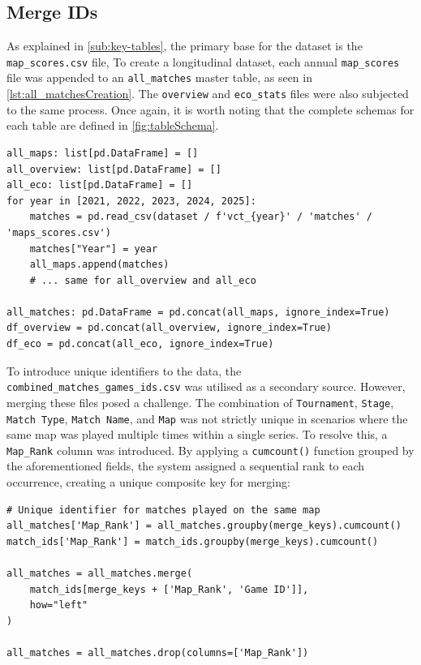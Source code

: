 \subsection{Merge IDs}
As explained in \autoref{sub:key-tables}, the primary base for the dataset is the \texttt{map\_scores.csv} file, To create a longitudinal dataset, each annual \texttt{map\_scores} file was appended to an \texttt{all\_matches} master table, as seen in \autoref{lst:all_matchesCreation}. The \texttt{overview} and \texttt{eco_stats} files were also subjected to the same process. Once again, it is worth noting that the complete schemas for each table are defined in \autoref{fig:tableSchema}.

\begin{lstlisting}[style=code, caption={Consolidating all five years worth of statistics for maps_scores, overview, and eco_stats}, label={lst:all_matchesCreation}]
all_maps: list[pd.DataFrame] = []
all_overview: list[pd.DataFrame] = []
all_eco: list[pd.DataFrame] = []
for year in [2021, 2022, 2023, 2024, 2025]:
    matches = pd.read_csv(dataset / f'vct_{year}' / 'matches' / 'maps_scores.csv')
    matches["Year"] = year
    all_maps.append(matches)
    # ... same for all_overview and all_eco

all_matches: pd.DataFrame = pd.concat(all_maps, ignore_index=True)
df_overview = pd.concat(all_overview, ignore_index=True)
df_eco = pd.concat(all_eco, ignore_index=True)
\end{lstlisting}

To introduce unique identifiers to the data, the \texttt{combined\_matches\_games\_ids.csv} was utilised as a secondary source. However, merging these files posed a challenge. The combination of \texttt{Tournament}, \texttt{Stage}, \texttt{Match Type}, \texttt{Match Name}, and \texttt{Map} was not strictly unique in scenarios where the same map was played multiple times within a single series. To resolve this, a \texttt{Map\_Rank} column was introduced. By applying a \texttt{cumcount()} function grouped by the aforementioned fields, the system assigned a sequential rank to each occurrence, creating a unique composite key for merging:

\begin{lstlisting}[style=code, caption={Utilising the date ordering of identical records to assign a unique identifier. This identifier is used as a composite key for merging with the IDs table}]
# Unique identifier for matches played on the same map
all_matches['Map_Rank'] = all_matches.groupby(merge_keys).cumcount()
match_ids['Map_Rank'] = match_ids.groupby(merge_keys).cumcount()

all_matches = all_matches.merge(
    match_ids[merge_keys + ['Map_Rank', 'Game ID']], 
    how="left"
)

all_matches = all_matches.drop(columns=['Map_Rank'])
\end{lstlisting}

